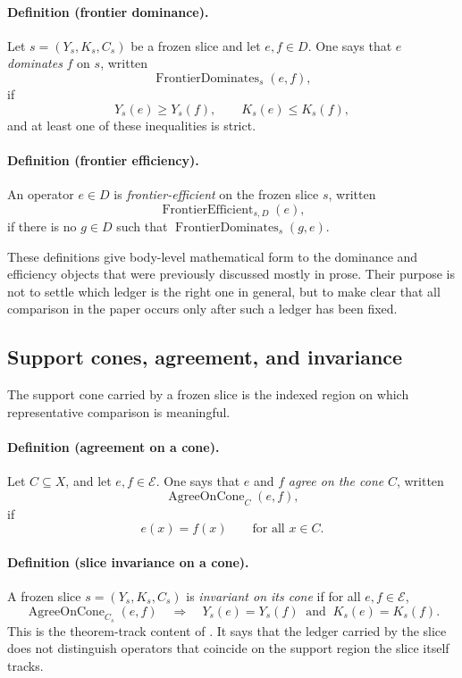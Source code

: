 \paragraph{Definition (frontier dominance).}
Let $s=(Y_s,K_s,C_s)$ be a frozen slice and let $e,f\in D$. One says that $e$ \emph{dominates} $f$ on $s$, written
\[
\operatorname{FrontierDominates}_s(e,f),
\]
if
\[
Y_s(e)\ge Y_s(f),\qquad K_s(e)\le K_s(f),
\]
and at least one of these inequalities is strict.

\paragraph{Definition (frontier efficiency).}
An operator $e\in D$ is \emph{frontier-efficient} on the frozen slice $s$, written
\[
\operatorname{FrontierEfficient}_{s,D}(e),
\]
if there is no $g\in D$ such that $\operatorname{FrontierDominates}_s(g,e)$.

These definitions give body-level mathematical form to the dominance and efficiency objects that were previously discussed mostly in prose. Their purpose is not to settle which ledger is the right one in general, but to make clear that all comparison in the paper occurs only after such a ledger has been fixed.

\subsection*{Support cones, agreement, and invariance}

The support cone carried by a frozen slice is the indexed region on which representative comparison is meaningful.

\paragraph{Definition (agreement on a cone).}
Let $C\subseteq X$, and let $e,f\in \mathcal{E}$. One says that $e$ and $f$ \emph{agree on the cone} $C$, written
\[
\operatorname{AgreeOnCone}_C(e,f),
\]
if
\[
e(x)=f(x)\qquad \text{for all }x\in C.
\]

\paragraph{Definition (slice invariance on a cone).}
A frozen slice $s=(Y_s,K_s,C_s)$ is \emph{invariant on its cone} if for all $e,f\in \mathcal{E}$,
\[
\operatorname{AgreeOnCone}_{C_s}(e,f)
\quad\Longrightarrow\quad
Y_s(e)=Y_s(f)\ \text{ and }\ K_s(e)=K_s(f).
\]
This is the theorem-track content of . It says that the ledger carried by the slice does not distinguish operators that coincide on the support region the slice itself tracks.


